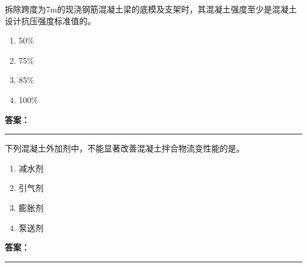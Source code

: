 \documentclass[UTF8,fontset=fandol,11pt]{ctexart}
\newcommand{\answerline}{\textcolor{answerred}{\rule{2.4cm}{0.7pt}}}
\begin{document}
\begin{quizbox}[title={乱序第 93 题｜第四章混凝土结构工程}]

拆除跨度为7m的现浇钢筋混凝土梁的底模及支架时，其混凝土强度至少是混凝土设计抗压强度标准值的。\\

\begin{enumerate}[label=\Alph*.]

\item 50\%

\item 75\%

\item 85\%

\item 100\%

\end{enumerate}

\textbf{\textcolor{answerred}{答案：}} \answerline

\end{quizbox}

\vspace{0.2em}

\begin{quizbox}[title={乱序第 94 题｜第四章混凝土结构工程}]

下列混凝土外加剂中，不能显著改善混凝土拌合物流变性能的是。\\

\begin{enumerate}[label=\Alph*.]

\item 减水剂

\item 引气剂

\item 膨胀剂

\item 泵送剂

\end{enumerate}

\textbf{\textcolor{answerred}{答案：}} \answerline

\end{quizbox}

\vspace{0.2em}
\end{document}
